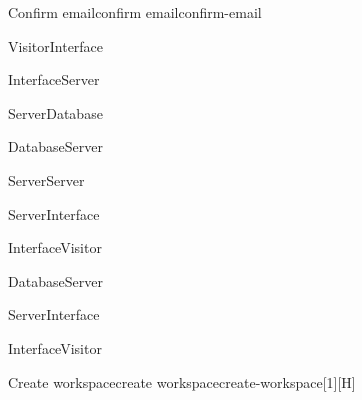 \begin{toexclude}
\begin{sdfig}{Confirm email}{confirm email}{confirm-email}

  \begin{umlcall}[op={Confirm}]{Visitor}{Interface}
    \begin{umlcall}[op={Confirm}]{Interface}{Server}
      \begin{umlcall}[op={Has OTP}]{Server}{Database}
        \begin{umlfragment}[type=alt, label=true]
          \begin{umlcall}[type=return,op={Yes}]{Database}{Server}
            \begin{umlcall}[op={Add cookies}]{Server}{Server}
            \end{umlcall}
            \begin{umlcall}[type=return,op={Ok}]{Server}{Interface}
              \begin{umlcall}[type=return,op={Ok}]{Interface}{Visitor}
              \end{umlcall}
            \end{umlcall}
          \end{umlcall}
          \umlfpart[else]
          \begin{umlcall}[type=return,op={No}]{Database}{Server}
            \begin{umlcall}[type=return,op={Error}]{Server}{Interface}
              \begin{umlcall}[type=return,op={Error}]{Interface}{Visitor}
              \end{umlcall}
            \end{umlcall}
          \end{umlcall}
        \end{umlfragment}
      \end{umlcall}
    \end{umlcall}
  \end{umlcall}
\end{sdfig}


\begin{sdfig}{Create workspace}{create workspace}{create-workspace}[1][H]


\end{sdfig}
\end{toexclude}
